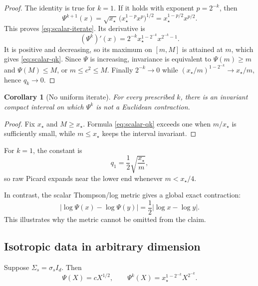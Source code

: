 \documentclass[11pt]{article}
\newtheorem{corollary}[theorem]{Corollary}
\theoremstyle{definition}
\newcommand{\Id}{I_d}
\newcommand{\abs}[1]{\left\lvert #1\right\rvert}
\begin{document}
\begin{proof}
The identity is true for $k=1$.  If it holds with exponent $p=2^{-k}$, then
\[
 \Psi^{k+1}(x)
 =\sqrt{x_\star}\,
 \bigl(x_\star^{1-p}x^p\bigr)^{1/2}
 =x_\star^{1-p/2}x^{p/2}.
\]
This proves \eqref{eq:scalar-iterate}.  Its derivative is
\[
 (\Psi^k)'(x)=2^{-k}x_\star^{1-2^{-k}}
 x^{2^{-k}-1}.
\]
It is positive and decreasing, so its maximum on $[m,M]$ is attained at $m$,
which gives \eqref{eq:scalar-qk}.  Since $\Psi$ is increasing, invariance is
equivalent to $\Psi(m)\geq m$ and $\Psi(M)\leq M$, or
$m\leq c^2\leq M$.  Finally $2^{-k}\to0$ while
$(x_\star/m)^{1-2^{-k}}\to x_\star/m$, hence $q_k\to0$.
\end{proof}

\begin{corollary}[No uniform iterate]\label{cor:no-uniform-k}
For every prescribed $k$, there is an invariant compact interval on which
$\Psi^k$ is not a Euclidean contraction.
\end{corollary}

\begin{proof}
Fix $x_\star$ and $M\geq x_\star$.  Formula
\eqref{eq:scalar-qk} exceeds one when $m/x_\star$ is sufficiently small, while
$m\leq x_\star$ keeps the interval invariant.
\end{proof}

For $k=1$, the constant is
\begin{equation}\label{eq:q1-scalar}
 q_1=\frac12\sqrt{\frac{x_\star}{m}},
\end{equation}
so raw Picard expands near the lower end whenever $m<x_\star/4$.

In contrast, the scalar Thompson/log metric gives a global exact contraction:
\begin{equation}\label{eq:scalar-log-contraction}
 \abs{\log\Psi(x)-\log\Psi(y)}
 =\frac12\abs{\log x-\log y}.
\end{equation}
This illustrates why the metric cannot be omitted from the claim.

\subsection{Isotropic data in arbitrary dimension}

Suppose $\Sigma_s=\sigma_s\Id$.  Then
\begin{equation}\label{eq:isotropic-Psi}
 \Psi(X)=cX^{1/2},\qquad
 \Psi^k(X)=x_\star^{1-2^{-k}}X^{2^{-k}}.
\end{equation}
\end{document}
